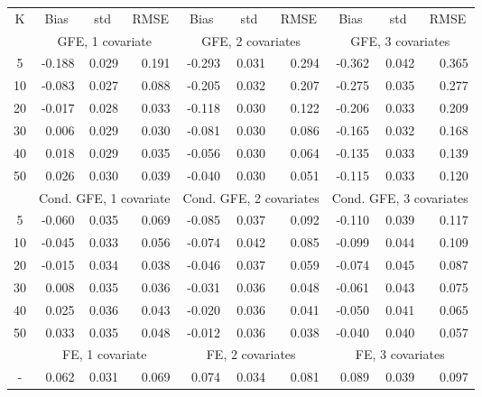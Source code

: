 \begin{tabular}{c r r r r r r r r r} 
\toprule 
K & \multicolumn{1}{c}{ Bias } & \multicolumn{1}{c}{ std } & \multicolumn{1}{c}{ RMSE } & \multicolumn{1}{c}{ Bias } & \multicolumn{1}{c}{ std } & \multicolumn{1}{c}{ RMSE } & \multicolumn{1}{c}{ Bias } & \multicolumn{1}{c}{ std } & \multicolumn{1}{c}{ RMSE }\\[2pt]
 & \multicolumn{ 3 }{c}{ GFE, 1 covariate} & \multicolumn{ 3 }{c}{ GFE, 2 covariates} & \multicolumn{ 3 }{c}{ GFE, 3 covariates}\\[-3pt]
 \cmidrule(lr){2-4}  \cmidrule(lr){5-7}  \cmidrule(lr){8-10}
5 &     -0.188 &      0.029 &      0.191 &     -0.293 &      0.031 &      0.294 &     -0.362 &      0.042 &      0.365\\
10 &     -0.083 &      0.027 &      0.088 &     -0.205 &      0.032 &      0.207 &     -0.275 &      0.035 &      0.277\\
20 &     -0.017 &      0.028 &      0.033 &     -0.118 &      0.030 &      0.122 &     -0.206 &      0.033 &      0.209\\
30 &      0.006 &      0.029 &      0.030 &     -0.081 &      0.030 &      0.086 &     -0.165 &      0.032 &      0.168\\
40 &      0.018 &      0.029 &      0.035 &     -0.056 &      0.030 &      0.064 &     -0.135 &      0.033 &      0.139\\
50 &      0.026 &      0.030 &      0.039 &     -0.040 &      0.030 &      0.051 &     -0.115 &      0.033 &      0.120\\[4pt]
 & \multicolumn{ 3 }{c}{ Cond. GFE, 1 covariate} & \multicolumn{ 3 }{c}{ Cond. GFE, 2 covariates} & \multicolumn{ 3 }{c}{ Cond. GFE, 3 covariates}\\[-3pt]
 \cmidrule(lr){2-4}  \cmidrule(lr){5-7}  \cmidrule(lr){8-10}
5 &     -0.060 &      0.035 &      0.069 &     -0.085 &      0.037 &      0.092 &     -0.110 &      0.039 &      0.117\\
10 &     -0.045 &      0.033 &      0.056 &     -0.074 &      0.042 &      0.085 &     -0.099 &      0.044 &      0.109\\
20 &     -0.015 &      0.034 &      0.038 &     -0.046 &      0.037 &      0.059 &     -0.074 &      0.045 &      0.087\\
30 &      0.008 &      0.035 &      0.036 &     -0.031 &      0.036 &      0.048 &     -0.061 &      0.043 &      0.075\\
40 &      0.025 &      0.036 &      0.043 &     -0.020 &      0.036 &      0.041 &     -0.050 &      0.041 &      0.065\\
50 &      0.033 &      0.035 &      0.048 &     -0.012 &      0.036 &      0.038 &     -0.040 &      0.040 &      0.057\\[4pt]
 & \multicolumn{ 3 }{c}{ FE, 1 covariate} & \multicolumn{ 3 }{c}{ FE, 2 covariates} & \multicolumn{ 3 }{c}{ FE, 3 covariates}\\[-3pt]
 \cmidrule(lr){2-4}  \cmidrule(lr){5-7}  \cmidrule(lr){8-10}
- &      0.062 &      0.031 &      0.069 &      0.074 &      0.034 &      0.081 &      0.089 &      0.039 &      0.097\\[0pt]
\bottomrule 
\end{tabular}
